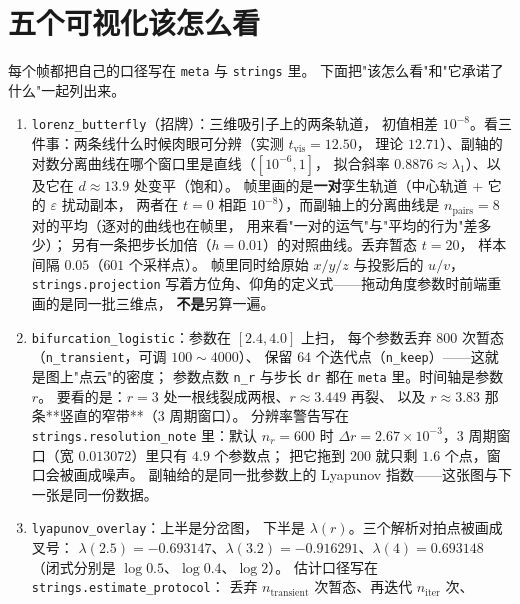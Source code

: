 \section{五个可视化该怎么看}

每个帧都把自己的口径写在 \texttt{meta} 与 \texttt{strings} 里。
下面把"该怎么看"和"它承诺了什么"一起列出来。

\begin{enumerate}
  \item \texttt{lorenz\_}\allowbreak\texttt{butterfly}（招牌）：三维吸引子上的两条轨道，
        初值相差 $10^{-8}$。看三件事：两条线什么时候肉眼可分辨（实测 $t_{\text{vis}}=12.50$，
        理论 $12.71$）、副轴的对数分离曲线在哪个窗口里是直线（$[10^{-6},1]$，
        拟合斜率 $0.8876\approx\lambda_1$）、以及它在 $d\approx13.9$ 处变平（饱和）。
        帧里画的是\textbf{一对}孪生轨道（中心轨道 + 它的 $\varepsilon$ 扰动副本，
        两者在 $t=0$ 相距 $10^{-8}$），而副轴上的分离曲线是
        $n_{\text{pairs}}=8$ 对的平均（逐对的曲线也在帧里，
        用来看"一对的运气"与"平均的行为"差多少）；
        另有一条把步长加倍（$h=0.01$）的对照曲线。丢弃暂态 $t=20$，
        样本间隔 $0.05$（$601$ 个采样点）。
        帧里同时给原始 $x/y/z$ 与投影后的 $u/v$，\texttt{strings.projection}
        写着方位角、仰角的定义式——拖动角度参数时前端重画的是同一批三维点，
        \textbf{不是}另算一遍。
  \item \texttt{bifurcation\_}\allowbreak\texttt{logistic}：参数在 $[2.4,4.0]$ 上扫，
        每个参数丢弃 $800$ 次暂态（\texttt{n\_transient}，可调 $100\sim4000$）、
        保留 $64$ 个迭代点（\texttt{n\_keep}）——这就是图上"点云"的密度；
        参数点数 \texttt{n\_r} 与步长 \texttt{dr} 都在 \texttt{meta} 里。时间轴是参数 $r$。
        要看的是：$r=3$ 处一根线裂成两根、$r\approx3.449$ 再裂、
        以及 $r\approx3.83$ 那条**竖直的窄带**（3 周期窗口）。
        分辨率警告写在 \texttt{strings.resolution\_note} 里：默认 $n_r=600$ 时
        $\Delta r=2.67\times10^{-3}$，3 周期窗口（宽 $0.013072$）里只有 $4.9$ 个参数点；
        把它拖到 $200$ 就只剩 $1.6$ 个点，窗口会被画成噪声。
        副轴给的是同一批参数上的 Lyapunov 指数——这张图与下一张是同一份数据。
  \item \texttt{lyapunov\_}\allowbreak\texttt{overlay}：上半是分岔图，
        下半是 $\lambda(r)$。三个解析对拍点被画成叉号：
        $\lambda(2.5)=-0.693147$、$\lambda(3.2)=-0.916291$、$\lambda(4)=0.693148$
        （闭式分别是 $\log0.5$、$\log0.4$、$\log2$）。
        估计口径写在 \texttt{strings.estimate\_}\allowbreak\texttt{protocol}：
        丢弃 $n_{\text{transient}}$ 次暂态、再迭代 $n_{\text{iter}}$ 次、

\end{enumerate}
